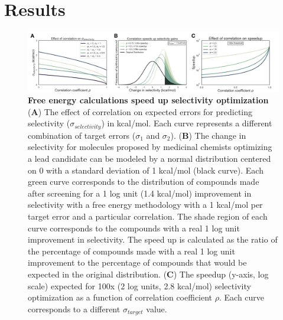 \documentclass[9pt,lineno]{elife-modified} %
\begin{document}
\section{Results}
\begin{figure}
\begin{fullwidth}
\begin{centering}
\includegraphics[width=1.0\linewidth]{figures/figure1.png}
\end{centering}
\caption{
\label{fig:figure-1}
{\bf Free energy calculations speed up selectivity optimization} \\
({\bf A})  The effect of correlation on expected errors for predicting selectivity ($\sigma_{selectivity}$) in kcal/mol. Each curve represents a different combination of target errors ($\sigma_1$ and $\sigma_2$). 
({\bf B}) The change in selectivity for molecules proposed by medicinal chemists optimizing a lead candidate can be modeled by a normal distribution centered on 0 with a standard deviation of 1 kcal/mol (black curve). Each green curve corresponds to the distribution of compounds made after screening for a 1 log unit (1.4 kcal/mol) improvement in selectivity with a free energy methodology with a 1 kcal/mol per target error and a particular correlation. The shade region of each curve corresponds to the compounds with a real 1 log unit  improvement in selectivity. The speed up is calculated as the ratio of the percentage of compounds made with a real 1 log unit improvement to the percentage of compounds that would be expected in the original distribution.  
({\bf C}) The speedup (y-axis, log scale) expected for 100x (2 log units, 2.8 kcal/mol) selectivity optimization as a function of correlation coefficient $\rho$. Each curve corresponds to a different $\sigma_{target}$ value.  
}
\end{fullwidth}
\end{figure}
\end{document}
